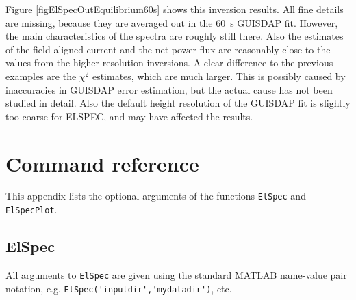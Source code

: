 \documentclass[12pt,a4paper]{report}
\begin{document}
Figure \ref{figElSpecOutEquilibrium60s} shows this inversion results. All fine details are missing, because they are averaged out in the 60~s GUISDAP fit. However, the main characteristics of the spectra are roughly still there. Also the estimates of the field-aligned current and the net power flux are reasonably close to the values from the higher resolution inversions. A clear difference to the previous examples are the $\chi^2$ estimates, which are much larger. This is possibly caused by inaccuracies in GUISDAP error estimation, but the actual cause has not been studied in detail. Also the default height resolution of the GUISDAP fit is slightly too coarse for ELSPEC, and may have affected the results.





\appendix


\chapter{Command reference}\label{chapCommands}

This appendix lists the optional arguments of the functions \verb|ElSpec| and \verb|ElSpecPlot|. 

\section{ElSpec}

All arguments to \verb|ElSpec| are given using the standard MATLAB name-value pair notation, e.g. \verb|ElSpec('inputdir','mydatadir')|, etc. 
\end{document}

